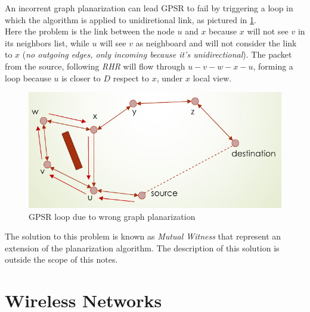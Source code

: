\documentclass[10pt,a4paper]{report}
\theoremstyle{definition}
\begin{document}
An incorrent graph planarization can lead GPSR to fail by triggering a loop in which the algorithm is applied to unidiretional link, as pictured in \ref{planarization-error}.\\
Here the problem is the link between the node $u$ and $x$ because $x$ will not see $v$ in its neighbors list, while $u$ will see $v$ as neighboard and will not consider the link to $x$ (\textit{no outgoing edges, only incoming because it's unidirectional}). The packet from the source, following \textit{RHR} will flow through $u-v-w-x-u$, forming a loop because $u$ is closer to $D$ respect to $x$, under $x$ local view.
\begin{figure}[h!]
	\centering\includegraphics[scale=0.50]{images/Pasted image 20230523165604.png}
	\caption{GPSR loop due to wrong graph planarization}
	\label{planarization-error}
\end{figure}

The solution to this problem is known as \textit{Mutual Witness} that represent an extension of the planarization algorithm. The description of this solution is outside the scope of this notes.


\clearpage


\chapter{Wireless Networks}
\end{document}

